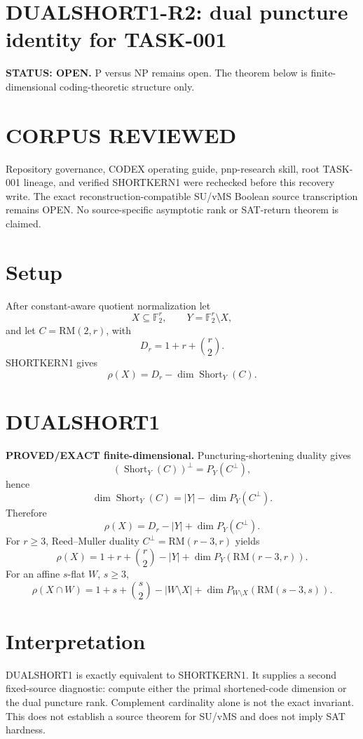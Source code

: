 \documentclass[11pt]{article}
\begin{document}
\section*{DUALSHORT1-R2: dual puncture identity for TASK-001}
\textbf{STATUS: OPEN.} P versus NP remains open. The theorem below is finite-dimensional coding-theoretic structure only.

\section*{CORPUS REVIEWED}
Repository governance, CODEX operating guide, pnp-research skill, root TASK-001 lineage, and verified SHORTKERN1 were rechecked before this recovery write. The exact reconstruction-compatible SU/vMS Boolean source transcription remains OPEN. No source-specific asymptotic rank or SAT-return theorem is claimed.

\section*{Setup}
After constant-aware quotient normalization let
\[
X\subseteq\mathbb F_2^r,\qquad Y=\mathbb F_2^r\setminus X,
\]
and let \(C=\mathrm{RM}(2,r)\), with
\[
D_r=1+r+\binom r2.
\]
SHORTKERN1 gives
\[
\rho(X)=D_r-\dim\operatorname{Short}_Y(C).
\]

\section*{DUALSHORT1}
\textbf{PROVED/EXACT finite-dimensional.}
Puncturing-shortening duality gives
\[
\left(\operatorname{Short}_Y(C)\right)^\perp=P_Y(C^\perp),
\]
hence
\[
\dim\operatorname{Short}_Y(C)=|Y|-\dim P_Y(C^\perp).
\]
Therefore
\[
\boxed{\rho(X)=D_r-|Y|+\dim P_Y(C^\perp).}
\]
For \(r\ge3\), Reed--Muller duality \(C^\perp=\mathrm{RM}(r-3,r)\) yields
\[
\boxed{
\rho(X)=1+r+\binom r2-|Y|+
\dim P_Y\!\left(\mathrm{RM}(r-3,r)\right).
}
\]
For an affine \(s\)-flat \(W\), \(s\ge3\),
\[
\boxed{
\rho(X\cap W)=1+s+\binom s2-|W\setminus X|+
\dim P_{W\setminus X}\!\left(\mathrm{RM}(s-3,s)\right).
}
\]

\section*{Interpretation}
DUALSHORT1 is exactly equivalent to SHORTKERN1. It supplies a second fixed-source diagnostic: compute either the primal shortened-code dimension or the dual puncture rank. Complement cardinality alone is not the exact invariant. This does not establish a source theorem for SU/vMS and does not imply SAT hardness.
\end{document}
